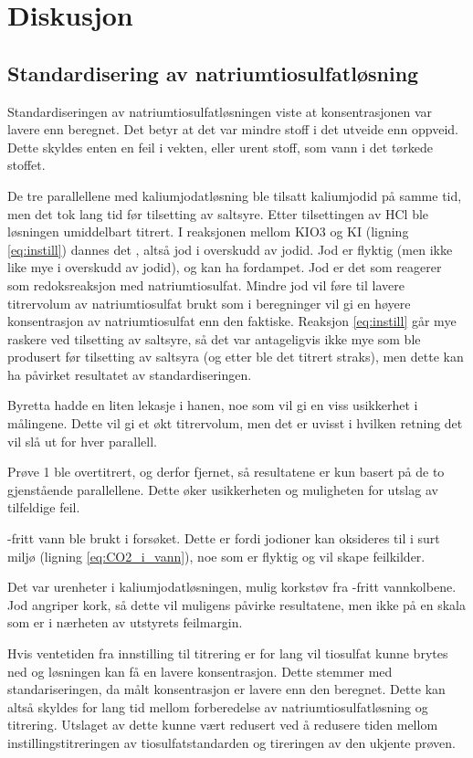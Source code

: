 \section{Diskusjon}

\subsection{Standardisering av natriumtiosulfatløsning}
Standardiseringen av natriumtiosulfatløsningen viste at konsentrasjonen var lavere enn beregnet. Det betyr at det var mindre stoff i det utveide enn oppveid. Dette skyldes enten en feil i vekten, eller urent stoff, som vann i det tørkede stoffet.

De tre parallellene med kaliumjodatløsning ble tilsatt kaliumjodid på samme tid, men det tok lang tid før tilsetting av saltsyre. Etter tilsettingen av HCl ble løsningen umiddelbart titrert. I reaksjonen mellom KIO3 og KI (ligning \ref{eq:instill}) dannes det , altså jod i overskudd av jodid. Jod er flyktig (men ikke like mye i overskudd av jodid), og kan ha fordampet. Jod er det som reagerer som redoksreaksjon med natriumtiosulfat. Mindre jod vil føre til lavere titrervolum av natriumtiosulfat brukt som i beregninger vil gi en høyere konsentrasjon av natriumtiosulfat enn den faktiske. Reaksjon \ref{eq:instill} går mye raskere ved tilsetting av saltsyre, så det var antageligvis ikke mye som ble produsert før tilsetting av saltsyra (og etter ble det titrert straks), men dette kan ha påvirket resultatet av standardiseringen.

Byretta hadde en liten lekasje i hanen, noe som vil gi en viss usikkerhet i målingene. Dette vil gi et økt titrervolum, men det er uvisst i hvilken retning det vil slå ut for hver parallell.

Prøve 1 ble overtitrert, og derfor fjernet, så resultatene er kun basert på de to gjenstående parallellene. Dette øker usikkerheten og muligheten for utslag av tilfeldige feil.

-fritt vann ble brukt i forsøket. Dette er fordi jodioner kan oksideres til  i surt miljø (ligning \ref{eq:CO2_i_vann}), noe som er flyktig og vil skape feilkilder. 

Det var urenheter i kaliumjodatløsningen, mulig korkstøv fra -fritt vannkolbene. Jod angriper kork, så dette vil muligens påvirke resultatene, men ikke på en skala som er i nærheten av utstyrets feilmargin. 

Hvis ventetiden fra innstilling til titrering er for lang vil tiosulfat kunne brytes ned og løsningen kan få en lavere konsentrasjon. Dette stemmer med standariseringen, da målt konsentrasjon er lavere enn den beregnet. Dette kan altså skyldes for lang tid mellom forberedelse av natriumtiosulfatløsning og titrering. Utslaget av dette kunne vært redusert ved å redusere tiden mellom instillingstitreringen av tiosulfatstandarden og tireringen av den ukjente prøven.

